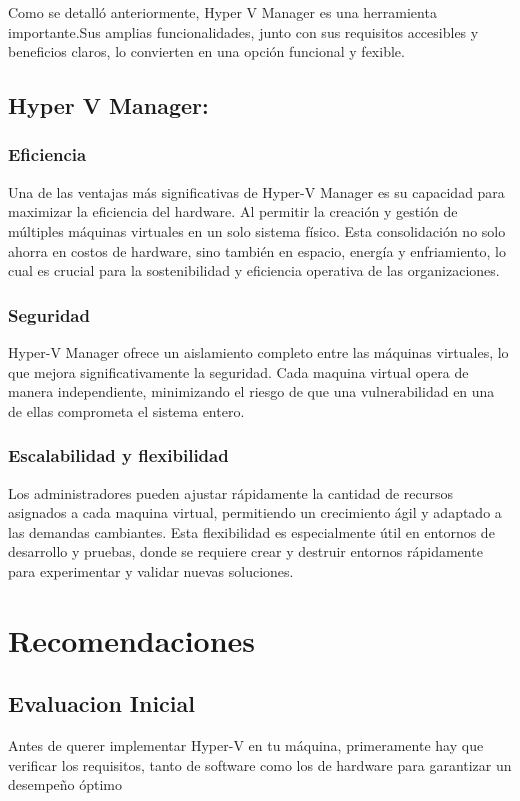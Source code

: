 \documentclass[journal]{IEEEtran}
\begin{document}
Como se detalló anteriormente, Hyper V Manager es una herramienta importante.Sus amplias funcionalidades, junto con sus requisitos accesibles y beneficios claros, lo convierten en una opción funcional y fexible.

\subsection{Hyper V Manager:}

\subsubsection{Eficiencia}
Una de las ventajas más significativas de Hyper-V Manager es su capacidad para maximizar la eficiencia del hardware. Al permitir la creación y gestión de múltiples máquinas virtuales en un solo sistema físico. Esta consolidación no solo ahorra en costos de hardware, sino también en espacio, energía y enfriamiento, lo cual es crucial para la sostenibilidad y eficiencia operativa de las organizaciones.

\subsubsection{Seguridad}
Hyper-V Manager ofrece un aislamiento completo entre las máquinas virtuales, lo que mejora significativamente la seguridad. Cada maquina virtual opera de manera independiente, minimizando el riesgo de que una vulnerabilidad en una de ellas comprometa el sistema entero.

\subsubsection{Escalabilidad y flexibilidad}
Los administradores pueden ajustar rápidamente la cantidad de recursos asignados a cada maquina virtual, permitiendo un crecimiento ágil y adaptado a las demandas cambiantes. Esta flexibilidad es especialmente útil en entornos de desarrollo y pruebas, donde se requiere crear y destruir entornos rápidamente para experimentar y validar nuevas soluciones.

\section{Recomendaciones}
\subsection{Evaluacion Inicial}
Antes de querer implementar Hyper-V en tu máquina, primeramente hay que verificar los requisitos, tanto de software como los de hardware para garantizar un desempeño óptimo
\end{document}
